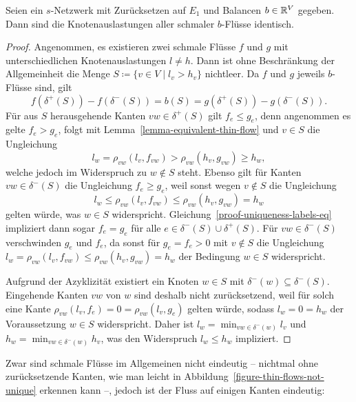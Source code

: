 \begin{lemma}\label{lemma-node-congestion-unique}
	Seien ein $s$-Netzwerk mit Zurücksetzen auf $E_1$ und Balancen $b\in\mathbb{R}^V$ gegeben.
	Dann sind die Knotenauslastungen aller schmaler $b$-Flüsse identisch.
\end{lemma}
\begin{proof}
	Angenommen, es existieren zwei schmale Flüsse $f$ und $g$ mit unterschiedlichen Knotenauslastungen $l\neq h$.
	Dann ist ohne Beschränkung der Allgemeinheit die Menge $S\coloneq \{ v\in V \mid l_v > h_v \}$ nichtleer.
	Da $f$ und $g$ jeweils $b$-Flüsse sind, gilt 
	\begin{equation}\label{proof-uniqueness-labels-eq}
	f( \delta^+(S)) - f(\delta^-(S)) = b(S) = g(\delta^+(S)) - g(\delta^-(S)).
	\end{equation}
	Für aus $S$ herausgehende Kanten $vw\in \delta^+(S)$ gilt $f_e \leq g_e$, denn angenommen es gelte $f_e > g_e$, folgt mit Lemma~\ref{lemma-equivalent-thin-flow} und $v\in S$ die Ungleichung 
	\[l_w = \rho_{vw}(l_v, f_{vw}) > \rho_{vw}(h_v, g_{vw})\geq h_w,\]
	welche jedoch im Widerspruch zu $w\notin S$ steht.
	Ebenso gilt für Kanten $vw\in\delta^-(S)$ die Ungleichung $f_e \geq g_e$, weil sonst wegen $v\notin S$ die Ungleichung
	\[l_w \leq \rho_{vw}(l_v, f_{vw}) \leq \rho_{vw}(h_v, g_{vw}) = h_w\]
	gelten würde, was $w\in S$ widerspricht.
	Gleichung~\ref{proof-uniqueness-labels-eq} impliziert dann sogar $f_e = g_e$ für alle $e\in \delta^-(S) \cup \delta^+(S)$.
	Für $vw\in \delta^-(S)$ verschwinden $g_e$ und $f_e$, da sonst für $g_e=f_e>0$ mit $v\notin S$ die Ungleichung $l_w = \rho_{vw}(l_v, f_{vw})\leq \rho_{vw}(h_v, g_{vw})=h_w$ der Bedingung $w\in S$ widerspricht.
	
	Aufgrund der Azyklizität existiert ein Knoten $w\in S$ mit $\delta^-(w)\subseteq \delta^-(S)$.
	Eingehende Kanten $vw$ von $w$ sind deshalb nicht zurücksetzend, weil für solch eine Kante $\rho_{vw}(l_v, f_e) = 0 = \rho_{vw}(l_v, g_e)$ gelten würde, sodass $l_w = 0 = h_w$ der Voraussetzung $w\in S$ widerspricht.
	Daher ist $l_w = \min_{vw\in \delta^-(w)} l_v$ und $h_w = \min_{vw\in\delta^-(w)} h_v$, was den Widerspruch $l_w \leq h_w$ impliziert.
\end{proof}

Zwar sind schmale Flüsse im Allgemeinen nicht eindeutig -- nichtmal ohne zurück\-setzende Kanten, wie man leicht in Abbildung~\ref{figure-thin-flows-not-unique} erkennen kann --, jedoch ist der Fluss auf einigen Kanten eindeutig:

